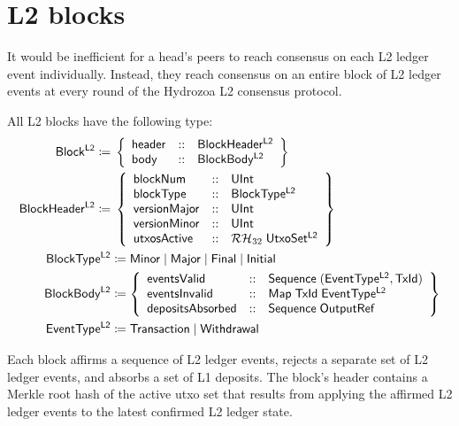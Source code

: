 \documentclass[../hydrozoa.tex]{subfiles}
\begin{document}
\chapter{L2 blocks}%
\label{h:l2-blocks}%

It would be inefficient for a head's peers to reach consensus on each L2 ledger event individually.
Instead, they reach consensus on an entire block of L2 ledger events at every round of the Hydrozoa L2 consensus protocol.

All L2 blocks have the following type:
\begin{equation*}
\begin{split}
  \mathsf{Block^{L2}} \coloneq&\; \left\{
    \begin{array}{lll}
      \mathsf{header} &::& \mathsf{BlockHeader^{L2}} \\
      \mathsf{body} &::& \mathsf{BlockBody^{L2}}
    \end{array}\right\} \\
  \mathsf{BlockHeader^{L2}} \coloneq&\; \left\{
    \begin{array}{lll}
      \mathsf{blockNum} &::& \mathsf{UInt} \\
      \mathsf{blockType} &::& \mathsf{BlockType^{L2}} \\
      \mathsf{versionMajor} &::& \mathsf{UInt} \\
      \mathsf{versionMinor} &::& \mathsf{UInt} \\
      \mathsf{utxosActive} &::& \mathcal{RH}_{32} \; \mathsf{UtxoSet^{L2}}
    \end{array}\right\} \\
  \mathsf{BlockType^{L2}} &\coloneq
    \mathsf{Minor} \mid
    \mathsf{Major} \mid
    \mathsf{Final} \mid
    \mathsf{Initial} \\
  \mathsf{BlockBody^{L2}} &\coloneq \left\{
  \begin{array}{lll}
    \mathsf{eventsValid} &::&
      \mathsf{Sequence} \; (\mathsf{EventType^{L2}}, \mathsf{TxId}) \\
    \mathsf{eventsInvalid} &::&
      \mathsf{Map} \; \mathsf{TxId} \; \mathsf{EventType^{L2}} \\
    \mathsf{depositsAbsorbed} &::& \mathsf{Sequence} \; \mathsf{OutputRef}
  \end{array}\right\} \\
  \mathsf{EventType^{L2}} &\coloneq \mathsf{Transaction} \mid \mathsf{Withdrawal}
\end{split}
\end{equation*}

Each block affirms a sequence of L2 ledger events, rejects a separate set of L2 ledger events, and absorbs a set of L1 deposits.
The block's header contains a Merkle root hash of the active utxo set that results from applying the affirmed L2 ledger events to the latest confirmed L2 ledger state.
\end{document}
